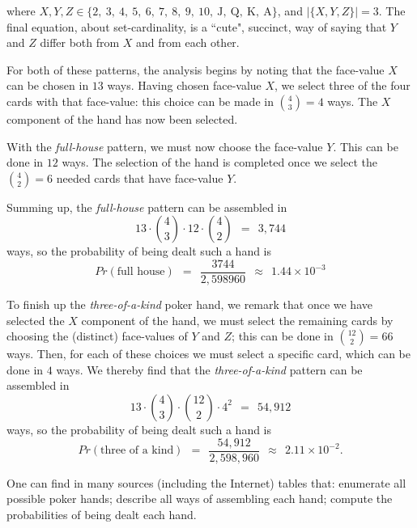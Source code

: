 \begin{itemize}
\begin{itemize}
\smallskip

where $X, Y,  Z \in \{2, \ 3, \ 4, \ 5, \ 6, \ 7, \ 8, \ 9, \ 10, \ \mbox{J}, \ \mbox{Q}, \ \mbox{K}, \ \mbox{A}\}$,  and $|\{X, Y, Z\}| =3$.  The final equation, about set-cardinality, is a ``cute", succinct, way of saying that $Y$ and $Z$ differ both from $X$ and from each other.
\end{itemize}
For both of these patterns, the analysis begins by noting that the face-value $X$ can be chosen
in $13$ ways.  Having chosen face-value $X$, we select three of the four cards with that face-value: this choice can be made in $\displaystyle {4 \choose 3} = 4$ ways.  The $X$ component of the hand has now been selected.

\smallskip

With the {\it full-house} pattern, we must now choose the face-value $Y$.  This can be done in $12$ ways.  The selection of the hand is completed once we select the $\displaystyle {4 \choose 2} = 6$ needed cards that have face-value $Y$.

\smallskip

Summing up, the {\it full-house} pattern can be assembled in
\[ 13 \cdot {4 \choose 3} \cdot 12 \cdot {4 \choose 2} \ \ = \ \  3,744 \]
ways, so the probability of being dealt such a hand is
\[ 
Pr(\mbox{full house}) \ \ = \ \
\frac{3744}{2,598960}  \ \ \approx \ \ 1.44 \times 10^{-3}
\]

\medskip

To finish up the {\it three-of-a-kind} poker hand, we remark that once we have selected the $X$
component of the hand, we must select the remaining cards by choosing the (distinct) face-values of $Y$ and $Z$; this can be done in $\displaystyle {12 \choose 2} = 66$ ways.  Then, for each of these choices we must select a specific card, which can be done in $4$ ways.  We thereby find that the {\it three-of-a-kind} pattern can be assembled in
\[ 13 \cdot {4 \choose 3} \cdot {12 \choose 2} \cdot 4^2 \ \ = \ \  54,912 \]
ways, so the probability of being dealt such a hand is
\[ Pr(\mbox{three of a kind}) \ \ = \ \
 \frac{54,912}{2,598,960}  \ \ \approx \ \ 2.11 \times 10^{-2} . \]
\end{itemize}

\medskip

One can find in many sources (including the Internet) tables that: enumerate all possible poker hands; describe all ways of assembling each hand; compute the probabilities of being dealt each hand.

\smallskip

